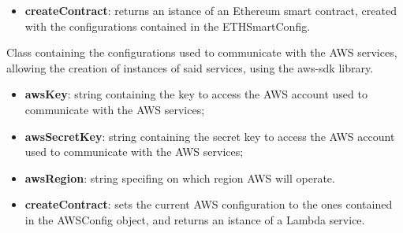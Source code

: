 	\begin{itemize}
		\item \textbf{createContract}: returns an istance of an Ethereum smart contract, created with the configurations contained in the ETHSmartConfig.
	\end{itemize}
	Class containing the configurations used to communicate with the AWS services, allowing the creation of instances of said services, using the aws-sdk library.
	\begin{itemize}
		\item \textbf{awsKey}: string containing the key to access the AWS account used to communicate with the AWS services;
		\item \textbf{awsSecretKey}: string containing the secret key to access the AWS account used to communicate with the AWS services;
		\item \textbf{awsRegion}: string specifing on which region AWS will operate.
	\end{itemize}
	\begin{itemize}
		\item \textbf{createContract}: sets the current AWS configuration to the ones contained in the AWSConfig object, and returns an istance of a Lambda service.
	\end{itemize}
